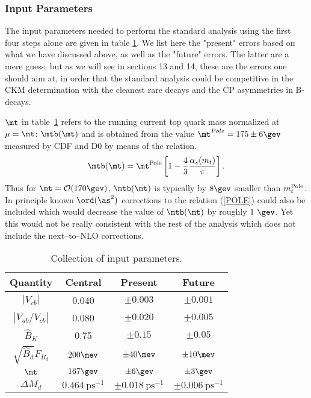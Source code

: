 \subsubsection{Input Parameters}
 The input parameters needed to perform the
standard analysis using the first four steps alone
are given in table \ref{tab:inputparams}.
We list here the "present" errors based on what we have discussed
above, as well as the "future" errors. The latter are a mere guess,
but as we will see in sections 13 and 14, these are the errors
one should aim at, in order that the standard analysis could be
competitive in the CKM determination with the cleanest rare decays and 
the CP asymmetries in B-decays. 

 $\mt$ in table~\ref{tab:inputparams} 
 refers
to the running current top quark mass normalized at $\mu=\mt$:
$\mtb(\mt)$ and is obtained from the value 
$\mt^{Pole}=175\pm 6\gev$ measured by CDF and D0 by means of the
relation.
 \begin{equation}\label{POLE}
\mtb(\mt)=\mt^{{\rm Pole}}
\left[ 1-\frac{4}{3}\frac{\alpha_s(m_t)}{\pi}\right].
\end{equation}
Thus for $\mt={\cal O}(170\gev)$, $\mtb(\mt)$ is typically
by $8\gev$ smaller than $m_t^{\rm Pole}$. 
In principle known $\ord(\as^2)$ corrections to the relation
(\ref{POLE}) could also be included which would decrease the value
of $\mtb(\mt)$ by roughly $1~\gev$.
Yet this would not be really consistent with the rest of the
analysis which does not include the next--to--NLO corrections.

\begin{table}[thb]
\caption[]{Collection of input parameters.\label{tab:inputparams}}
\vspace{0.4cm}
\begin{center}
\begin{tabular}{|c|c|c|c|}
\hline
{\bf Quantity} & {\bf Central} & {\bf Present} & {\bf Future} \\
\hline
$|V_{cb}|$ & 0.040 & $\pm 0.003$ & $\pm 0.001 $\\
$|V_{ub}/V_{cb}|$ & 0.080 & $\pm 0.020$ & $\pm 0.005 $ \\
$\hat B_K$ & 0.75 & $\pm 0.15$ & $\pm 0.05$ \\
$\sqrt{\hat B_d} F_{B_{d}}$ & $200\mev$ & $\pm 40\mev$ &$\pm 10\mev$ \\
$\mt$ & $167\gev$ & $\pm 6\gev$ & $\pm 3\gev $\\
$\Delta M_d$ & $0.464~\mbox{ps}^{-1}$ & $\pm 0.018~\mbox{ps}^{-1}$ 
& $\pm 0.006~\mbox{ps}^{-1}$\\ 
\hline
\end{tabular}
\end{center}
\end{table}
